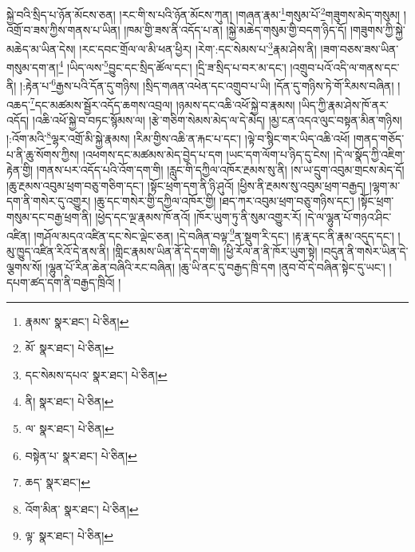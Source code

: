 སྐྱེ་བའི་སྲིད་པ་ཉོན་མོངས་ཅན། །རང་གི་ས་པའི་ཉོན་མོངས་ཀུན། །གཞན་རྣམ་\footnote{རྣམས་  སྣར་ཐང་།  པེ་ཅིན། }གསུམ་པོ་\footnote{མོ་  སྣར་ཐང་།  པེ་ཅིན། }གཟུགས་མེད་གསུམ། །འགྲོ་བ་ཟས་ཀྱིས་གནས་པ་ཡིན། །ཁམ་གྱི་ཟས་ནི་འདོད་པ་ན། །སྐྱེ་མཆེད་གསུམ་གྱི་བདག་ཉིད་དོ། །གཟུགས་ཀྱི་སྐྱེ་མཆེད་མ་ཡིན་དེས། །རང་དབང་གྲོལ་ལ་མི་ཕན་ཕྱིར། །རེག་:དང་སེམས་པ་\footnote{དང་སེམས་དཔའ་  སྣར་ཐང་།  པེ་ཅིན། }རྣམ་ཤེས་ནི། །ཟག་བཅས་ཟས་ཡིན་གསུམ་དག་ན།\footnote{ནི།  སྣར་ཐང་།  པེ་ཅིན། } །ཡིད་ལས་\footnote{ལ་  སྣར་ཐང་།  པེ་ཅིན། }བྱུང་དང་སྲིད་ཚོལ་དང་། །དྲི་ཟ་སྲིད་པ་བར་མ་དང་། །འགྲུབ་པའོ་འདི་ལ་གནས་དང་ནི། །:རྟེན་པ་\footnote{བསྟེན་པ་  སྣར་ཐང་།  པེ་ཅིན། }རྒྱས་པའི་དོན་དུ་གཉིས། །སྲིད་གཞན་འཕེན་དང་འགྲུབ་པ་ཡི། །དོན་དུ་གཉིས་ཏེ་གོ་རིམས་བཞིན། །འཆད་\footnote{ཆད་  སྣར་ཐང་། }དང་མཚམས་སྦྱོར་འདོད་ཆགས་འབྲལ། །ཉམས་དང་འཆི་འཕོ་སྐྱེ་བ་རྣམས། །ཡིད་ཀྱི་རྣམ་ཤེས་ཁོ་ནར་འདོད། །འཆི་འཕོ་སྐྱེ་བ་བཏང་སྙོམས་ལ། །རྩེ་གཅིག་སེམས་མེད་ལ་དེ་མེད། །མྱ་ངན་འདའ་ལུང་བསྟན་མིན་གཉིས། །:འོག་མའི་\footnote{འོག་མིན་  སྣར་ཐང་།  པེ་ཅིན། }ལྷར་འགྲོ་མི་སྐྱེ་རྣམས། །རིམ་གྱིས་འཆི་ན་རྐང་པ་དང་། །ལྟེ་བ་སྙིང་གར་ཡིད་འཆི་འཕོ། །གནད་གཅོད་པ་ནི་ཆུ་སོགས་ཀྱིས། །འཕགས་དང་མཚམས་མེད་བྱེད་པ་དག །ཡང་དག་ལོག་པ་ཉིད་དུ་ངེས། །དེ་ལ་སྣོད་ཀྱི་འཇིག་རྟེན་གྱི། །གནས་པར་འདོད་པའི་འོག་དག་གི། །རླུང་གི་དཀྱིལ་འཁོར་རྔམས་སུ་ནི། །ས་ཡ་དྲུག་འབུམ་གྲངས་མེད་དོ། །ཆུ་རྔམས་འབུམ་ཕྲག་བཅུ་གཅིག་དང་། །སྟོང་ཕྲག་དག་ནི་ཉི་ཤུའོ། །ཕྱིས་ནི་རྔམས་སུ་འབུམ་ཕྲག་བརྒྱད། །ལྷག་མ་དག་ནི་གསེར་དུ་འགྱུར། །ཆུ་དང་གསེར་གྱི་དཀྱིལ་འཁོར་གྱི། །ཐད་ཀར་འབུམ་ཕྲག་བཅུ་གཉིས་དང་། །སྟོང་ཕྲག་གསུམ་དང་བརྒྱ་ཕྲག་ནི། །ཕྱེད་དང་ལྔ་རྣམས་ཁོ་ནའོ། །ཁོར་ཡུག་ཏུ་ནི་སུམ་འགྱུར་རོ། །དེ་ལ་ལྷུན་པོ་གཉའ་ཤིང་འཛིན། །གཤོལ་མདའ་འཛིན་དང་སེང་ལྡེང་ཅན། །དེ་བཞིན་བལྟ་\footnote{ལྟ་  སྣར་ཐང་།  པེ་ཅིན། }ན་སྡུག་རི་དང་། །རྟ་རྣ་དང་ནི་རྣམ་འདུད་དང་། །མུ་ཁྱུད་འཛིན་རིའོ་དེ་ནས་ནི། །གླིང་རྣམས་ཡིན་ནོ་དེ་དག་གི། །ཕྱི་རོལ་ན་ནི་ཁོར་ཡུག་སྟེ། །བདུན་ནི་གསེར་ཡིན་དེ་ལྕགས་སོ། །ལྷུན་པོ་རིན་ཆེན་བཞིའི་རང་བཞིན། །ཆུ་ཡི་ནང་དུ་བརྒྱད་ཁྲི་དག །ནུབ་བོ་དེ་བཞིན་སྟེང་དུ་ཡང་། །དཔག་ཚད་དག་ནི་བརྒྱད་ཁྲིའོ། །
